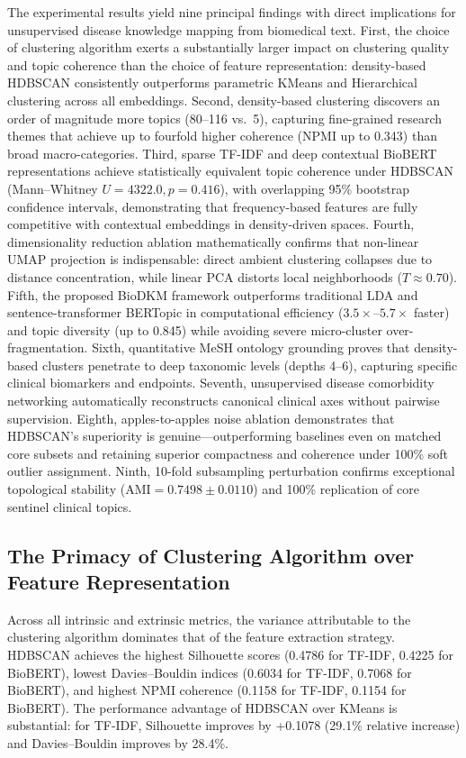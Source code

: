 \documentclass[a4paper,fleqn]{cas-dc}
\begin{document}
The experimental results yield nine principal findings with direct implications for unsupervised disease knowledge mapping from biomedical text. First, the choice of clustering algorithm exerts a substantially larger impact on clustering quality and topic coherence than the choice of feature representation: density-based HDBSCAN consistently outperforms parametric KMeans and Hierarchical clustering across all embeddings. Second, density-based clustering discovers an order of magnitude more topics (80--116 vs.\ 5), capturing fine-grained research themes that achieve up to fourfold higher coherence (NPMI up to 0.343) than broad macro-categories. Third, sparse TF-IDF and deep contextual BioBERT representations achieve statistically equivalent topic coherence under HDBSCAN (Mann--Whitney $U=4322.0, p=0.416$), with overlapping 95\% bootstrap confidence intervals, demonstrating that frequency-based features are fully competitive with contextual embeddings in density-driven spaces. Fourth, dimensionality reduction ablation mathematically confirms that non-linear UMAP projection is indispensable: direct ambient clustering collapses due to distance concentration, while linear PCA distorts local neighborhoods ($T \approx 0.70$). Fifth, the proposed BioDKM framework outperforms traditional LDA and sentence-transformer BERTopic in computational efficiency ($3.5\times$--$5.7\times$ faster) and topic diversity (up to 0.845) while avoiding severe micro-cluster over-fragmentation. Sixth, quantitative MeSH ontology grounding proves that density-based clusters penetrate to deep taxonomic levels (depths 4--6), capturing specific clinical biomarkers and endpoints. Seventh, unsupervised disease comorbidity networking automatically reconstructs canonical clinical axes without pairwise supervision. Eighth, apples-to-apples noise ablation demonstrates that HDBSCAN's superiority is genuine—outperforming baselines even on matched core subsets and retaining superior compactness and coherence under 100\% soft outlier assignment. Ninth, 10-fold subsampling perturbation confirms exceptional topological stability ($\text{AMI} = 0.7498 \pm 0.0110$) and 100\% replication of core sentinel clinical topics.

\subsection{The Primacy of Clustering Algorithm over Feature Representation}

Across all intrinsic and extrinsic metrics, the variance attributable to the clustering algorithm dominates that of the feature extraction strategy. HDBSCAN achieves the highest Silhouette scores (0.4786 for TF-IDF, 0.4225 for BioBERT), lowest Davies--Bouldin indices (0.6034 for TF-IDF, 0.7068 for BioBERT), and highest NPMI coherence (0.1158 for TF-IDF, 0.1154 for BioBERT). The performance advantage of HDBSCAN over KMeans is substantial: for TF-IDF, Silhouette improves by +0.1078 (29.1\% relative increase) and Davies--Bouldin improves by 28.4\%.
\end{document}
